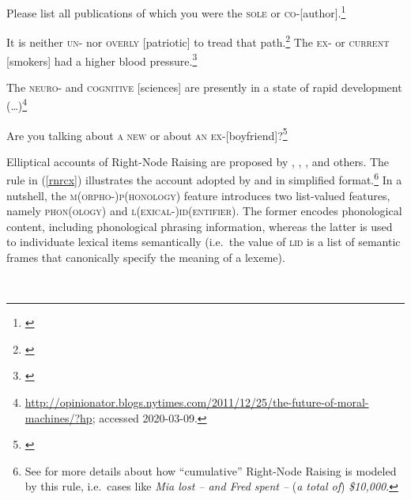 \eal
\label{rnrex2}
\ex Please list all publications of which you were the \textsc{sole} or
\textsc{co}-[author].\footnote{\citep[1325, fn.\ 44]{rodney}}
 
\ex  It is neither \textsc{un}- nor \textsc{overly} [patriotic] to tread that path.\footnote{\citep[]{chaveslp}} 
\ex The \textsc{ex-} or \textsc{current} [smokers] had a higher blood pressure.\footnote{\citep[]{chaveslp}} 

\ex The \textsc{neuro}- and \textsc{cognitive} [sciences] are
presently in a state of rapid development
(\ldots{})\footnote{\url{http://opinionator.blogs.nytimes.com/2011/12/25/the-future-of-moral-machines/?hp};
  accessed 2020-03-09.}

\ex Are you talking about \textsc{a new}  or about \textsc{an ex}-[boyfriend]?\footnote{\citep[867]{chavesrnr}}

\zl


Elliptical accounts of Right-Node Raising are proposed by \citet{Beavers},
\citet{Yatabe:04}, \citet{chavesrnr}, and others. The rule in (\ref{rnrcx}) illustrates the account adopted by 
 \citet[874]{chavesrnr}  and \citet*[]{aoi}
  in simplified format.\footnote{See \citet{chavesrnr} for more details about how ``cumulative'' Right-Node Raising is modeled by this rule, i.e.\
 cases like \emph{Mia lost -- and Fred spent --} (\emph{a total of}) \emph{\$10,000}.}
In a nutshell, the \textsc{m(orpho-)p(honology)} feature introduces two list-valued features, namely \textsc{phon}(\textsc{ology}) and \textsc{l(exical-)id(entifier)}. The former encodes phonological content, including phonological phrasing information,  whereas the latter is used to individuate lexical items semantically (i.e.\  the value
of \textsc{lid} is a list of semantic frames that canonically specify the meaning of a lexeme).
 
\eas
\label{rnrcx}
 \impl\\
\zs

